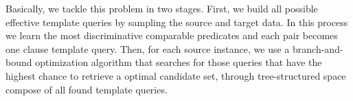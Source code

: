  




Basically, we tackle this problem in two stages. First, we build all possible effective template queries by sampling the source and target data. In this process we learn the most discriminative comparable predicates and each pair becomes one clause template query. Then, for each source instance, we use a branch-and-bound optimization algorithm that searches for those queries that have the highest chance to retrieve a optimal candidate set, through tree-structured space compose of all found template queries. 

